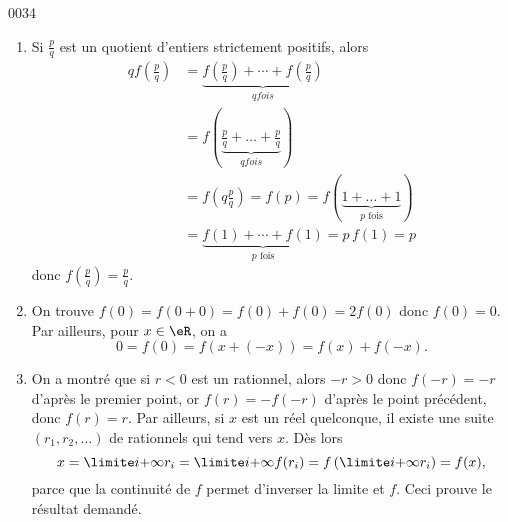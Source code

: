 
\begin{corrige}{0034}

\begin{enumerate}
\item Si $\frac p q$ est un quotient d'entiers strictement positifs,
  alors
  \begin{align*}
    q f(\frac pq) &= \underbrace{f(\frac pq) + \cdots + f(\frac pq)}_{\text{$q fois$}}\\
    &= f(\underbrace{\frac pq + \ldots
      + \frac pq}_{\text{$q fois$}})\\
    &= f(q \frac pq) = f(p) = f(\underbrace{1 +
      \ldots + 1}_{\text{$p$ fois}})\\
    &= \underbrace{f(1)+\cdots+f(1)}_{\text{$p$ fois}} = p \, f(1) = p
  \end{align*}
  donc $f(\frac pq) = \frac pq$.

\item On trouve $f(0) = f(0+0) = f(0)+f(0) = 2 f(0)$ donc
  $f(0)=0$. Par ailleurs, pour $x \in \eR$, on a
  \begin{equation*}
    0 = f(0) = f(x+(-x)) = f(x) + f(-x).
  \end{equation*}

\item On a montré que si $r < 0$ est un rationnel, alors $-r > 0$ donc $f(-r) = -r$ d'après le premier point, or $f(r) = -f(-r)$ d'après le point précédent, donc $f(r) = r$. Par ailleurs, si $x$ est un réel quelconque, il existe une suite $(r_1, r_2, \ldots)$ de rationnels qui tend vers $x$. Dès lors
  \begin{equation*}
    x = \limite i {+\infty} r_i =  \limite i {+\infty} f(r_i) = f\left(\limite i {+\infty} r_i\right) = f(x),
  \end{equation*}
parce que la continuité de $f$ permet d'inverser la limite et $f$. Ceci prouve le résultat demandé.
\end{enumerate}

\end{corrige}

